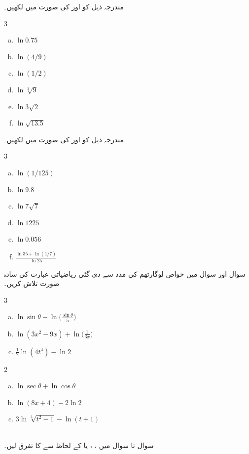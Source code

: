 مندرجہ ذیل کو  اور  کی صورت میں لکھیں۔
\begin{multicols}{3}
\begin{enumerate}[a.]
\item
$\ln 0.75$
\item
$\ln (4/9)$
\item
$\ln (1/2)$
\item
$\ln\sqrt[3]{9}$
\item
$\ln 3\sqrt{2}$
\item
$\ln\sqrt{13.5}$
\end{enumerate}
\end{multicols}
مندرجہ ذیل کو  اور  کی صورت میں لکھیں۔
\begin{multicols}{3}
\begin{enumerate}[a.]
\item
$\ln (1/125)$
\item
$\ln 9.8$
\item
$\ln 7\sqrt{7}$
\item
$\ln1225$
\item
$\ln 0.056$
\item
$ \tfrac{\ln 35+\ln(1/7)}{\ln 25}$
\end{enumerate}
\end{multicols}
سوال  اور سوال  میں خواص لوگارتھم کی مدد سے دی گئی ریاضیاتی عبارت کی سادہ صورت تلاش کریں۔

\begin{multicols}{3}
\begin{enumerate}[a.]
\item
$\ln \sin\theta-\ln \big(\frac{\sin\theta}{5}\big)$
\item
$\ln(3x^2-9x)+\ln\big(\frac{1}{3x}\big)$
\item
$\frac{1}{2}\ln(4t^4)-\ln 2$
\end{enumerate}
\end{multicols}
\begin{multicols}{2}
\begin{enumerate}[a.]
\item
$\ln \sec\theta+\ln\cos\theta$
\item
$\ln(8x+4)-2\ln2$
\item
$3\ln\sqrt[3]{t^2-1}-\ln(t+1)$
\end{enumerate}
\end{multicols}
\\
سوال  تا سوال  میں ، ،  یا  کے لحاظ سے  کا تفرق لیں۔

